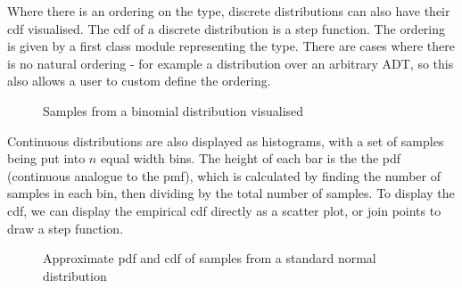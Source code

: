 Where there is an ordering on the type, discrete distributions can also have their cdf visualised. The cdf of a discrete distribution is a step function. The ordering is given by a first class module representing the type. There are cases where there is no natural ordering - for example a distribution over an arbitrary ADT, so this also allows a user to custom define the ordering.
% 
\begin{figure}[!htb]
	\centering
	\qquad
	\caption{Samples from a binomial distribution visualised}
	\label{fig:vis-binom}
\end{figure}
% 
Continuous distributions are also displayed as histograms, with a set of samples being put into $n$ equal width bins. The height of each bar is the the pdf (continuous analogue to the pmf), which is calculated by finding the number of samples in each bin, then dividing by the total number of samples. To display the cdf, we can display the empirical cdf directly as a scatter plot, or join points to draw a step function.

\begin{figure}[!htb]
	\centering
	\qquad
	\caption{Approximate pdf and cdf of samples from a standard normal distribution}
	\label{fig:vis-norm}
\end{figure}

